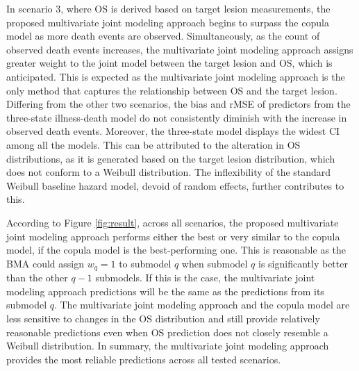 In scenario 3, where \ac{OS} is derived based on target lesion measurements, the proposed multivariate joint modeling approach begins to surpass the copula model as more death events are observed. Simultaneously, as the count of observed death events increases, the multivariate joint modeling approach assigns greater weight to the joint model between the target lesion and OS, which is anticipated. This is expected as the multivariate joint modeling approach is the only method that captures the relationship between \ac{OS} and the target lesion. Differing from the other two scenarios, the bias and \ac{rMSE} of predictors from the three-state illness-death model do not consistently diminish with the increase in observed death events. Moreover, the three-state model displays the widest \ac{CI} among all the models. This can be attributed to the alteration in \ac{OS} distributions, as it is generated based on the target lesion distribution, which does not conform to a Weibull distribution. The inflexibility of the standard Weibull baseline hazard model, devoid of random effects, further contributes to this.

According to Figure \ref{fig:result}, across all scenarios, the proposed multivariate joint modeling approach performs either the best or very similar to the copula model, if the copula model is the best-performing one. This is reasonable as the \ac{BMA} could assign $w_q = 1$ to submodel $q$ when submodel $q$ is significantly better than the other $q-1$ submodels. If this is the case, the multivariate joint modeling approach predictions will be the same as the predictions from its submodel $q$. The multivariate joint modeling approach and the copula model are less sensitive to changes in the \ac{OS} distribution and still provide relatively reasonable predictions even when \ac{OS} prediction does not closely resemble a Weibull distribution. In summary, the multivariate joint modeling approach provides the most reliable predictions across all tested scenarios.

